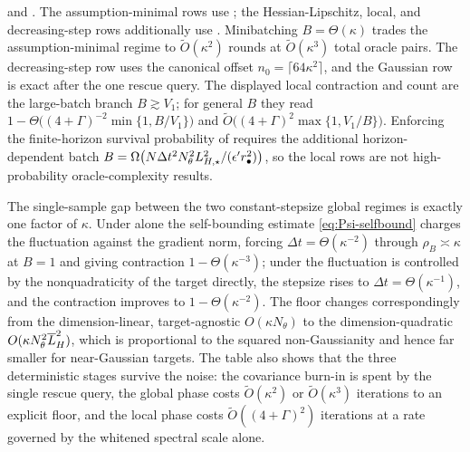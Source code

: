 \begin{table}[t]
{ and . The assumption-minimal rows use
; the Hessian-Lipschitz, local, and decreasing-step rows additionally
use . Minibatching $B=\Theta(\kappa)$ trades the assumption-minimal regime to
$\widetilde O(\kappa^2)$ rounds at $\widetilde O(\kappa^3)$ total oracle pairs. The decreasing-step row
uses the canonical offset $n_0=\lceil64\kappa^2\rceil$, and the Gaussian row is exact after the one
rescue query. The displayed local contraction and count are the large-batch branch $B\gtrsim V_1$; for
general $B$ they read $1-\Theta\bigl((4+\Gamma)^{-2}\min\{1,B/V_1\}\bigr)$ and
$\widetilde O\bigl((4+\Gamma)^2\max\{1,V_1/B\}\bigr)$. Enforcing the finite-horizon survival
probability of  requires the additional horizon-dependent batch
$B=\Omega\bigl(N\Delta t^2N_\theta^2L_{H,\star}^2/(\epsilon'r_\bullet^2)\bigr)$, so the local rows are not
high-probability oracle-complexity results.}
\label{tab:complexity}
\end{table}

The single-sample gap between the two constant-stepsize global regimes is exactly one factor of
$\kappa$. Under  alone the self-bounding estimate
\eqref{eq:Psi-selfbound} charges the fluctuation against the gradient norm, forcing
$\Delta t=\Theta(\kappa^{-2})$ through $\rho_B\asymp\kappa$ at $B=1$ and giving contraction
$1-\Theta(\kappa^{-3})$; under  the fluctuation is controlled by the
nonquadraticity of the target directly, the stepsize rises to $\Delta t=\Theta(\kappa^{-1})$, and the
contraction improves to $1-\Theta(\kappa^{-2})$. The floor changes correspondingly from the
dimension-linear, target-agnostic $O(\kappa N_\theta)$ to the dimension-quadratic
$O(\kappa N_\theta^2\overline{L}_H^2)$, which is proportional to the squared non-Gaussianity and hence far
smaller for near-Gaussian targets. The table also shows that the three deterministic stages survive
the noise: the covariance burn-in is spent by the single rescue query, the global
phase costs $\widetilde O(\kappa^2)$ or $\widetilde O(\kappa^3)$ iterations to an explicit floor, and
the local phase costs $\widetilde O((4+\Gamma)^2)$ iterations at a rate governed by the whitened
spectral scale alone.

